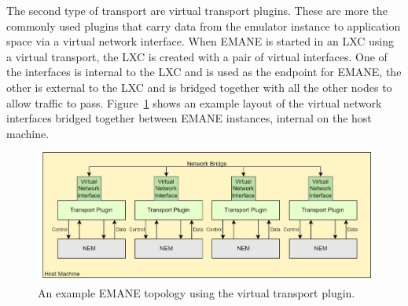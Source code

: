 The second type of transport are virtual transport plugins.
These are more the commonly used plugins that carry data from the emulator instance to application space via a virtual network interface.
When EMANE is started in an LXC using a virtual transport, the LXC is created with a pair of virtual interfaces.
One of the interfaces is internal to the LXC and is used as the endpoint for EMANE, the other is external to the LXC and is bridged together with all the other nodes to allow traffic to pass.
Figure~\ref{emane_virtual_transport} shows an example layout of the virtual network interfaces bridged together between EMANE instances, internal on the host machine.

\begin{figure}[!ht]
    \centering
    \includegraphics[width=\textwidth,keepaspectratio]{Images/Chpt2/VirtualTransport.png}
    \caption{An example EMANE topology using the virtual transport plugin.}
    \label{emane_virtual_transport}
\end{figure}

